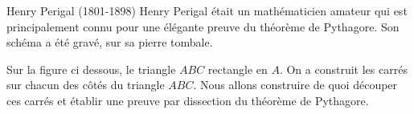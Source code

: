\begin{activite}
    \begin{myBox}{Henry Perigal (1801-1898)}
        Henry Perigal était un mathématicien amateur qui est principalement connu pour une élégante preuve du théorème de Pythagore.
        Son schéma a été gravé, sur sa pierre tombale.
        
        \smallskip
    \end{myBox}

    Sur la figure ci dessous, le triangle $ABC$ rectangle en $A$. On a construit les carrés sur chacun des côtés du triangle $ABC$.
    Nous allons construire de quoi découper ces carrés et établir une preuve par dissection du théorème de Pythagore.


\end{activite}
